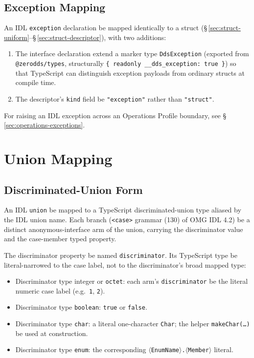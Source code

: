 \documentclass{../styles/zerodds-vendor-spec}
\begin{document}
\subsection{Exception Mapping}\label{sec:struct-exception}

An IDL \texttt{exception} declaration  be mapped
identically to a struct
(\S\,\ref{sec:struct-uniform}–\S\,\ref{sec:struct-descriptor}),
with two additions:

\begin{enumerate}
  \item The interface declaration  extend a marker
        type \texttt{DdsException} (exported from
        \texttt{@zerodds/types}, structurally
        \texttt{\{ readonly \_\_dds\_exception: true \}}) so that
        TypeScript can distinguish exception payloads from
        ordinary structs at compile time.
  \item The descriptor's \texttt{kind} field  be
        \texttt{"exception"} rather than \texttt{"struct"}.
\end{enumerate}

For raising an IDL exception across an Operations Profile
boundary, see \S\,\ref{sec:operations-exceptions}.

\section{Union Mapping}\label{sec:union-mapping}

\subsection{Discriminated-Union Form}

An IDL \texttt{union}  be mapped to a TypeScript
discriminated-union type aliased by the IDL union name. Each
branch (\texttt{<case>} grammar (130) of OMG IDL 4.2) 
be a distinct anonymous-interface arm of the union, carrying the
discriminator value and the case-member typed property.

The discriminator property  be named
\texttt{discriminator}. Its TypeScript type  be
literal-narrowed to the case label, not to the discriminator's
broad mapped type:

\begin{itemize}[noitemsep]
  \item Discriminator type integer or \texttt{octet}: each arm's
        \texttt{discriminator}  be the literal numeric
        case label (e.g.\ \texttt{1}, \texttt{2}).
  \item Discriminator type \texttt{boolean}: \texttt{true} or
        \texttt{false}.
  \item Discriminator type \texttt{char}: a literal one-character
        \texttt{Char}; the helper \texttt{makeChar(\ldots)}
         be used at construction.
  \item Discriminator type \texttt{enum}: the corresponding
        \texttt{$\langle$EnumName$\rangle$.$\langle$Member$\rangle$}
        literal.
\end{itemize}
\end{document}
